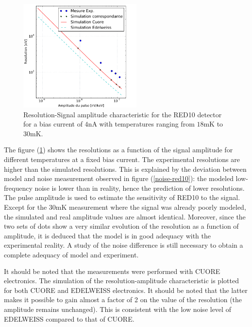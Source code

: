 \begin{figure}[!ht]
\begin{center}
\includegraphics[width=0.55\textwidth]{Figures/Ethem/resamp_fin_fin.pdf}
\end{center}
\caption{Resolution-Signal amplitude characteristic for the RED10 detector for a bias current of $4$nA with temperatures ranging from $18$mK to $30$mK.}
\label{amp-res-red10}
\end{figure}


The figure (\ref{amp-res-red10}) shows the resolutions as a function of the signal amplitude for different temperatures at a fixed bias current. The experimental resolutions are higher than the simulated resolutions. This is explained by the deviation between model and noise measurement observed in figure (\ref{noise-red10}): the modeled low-frequency noise is lower than in reality, hence the prediction of lower resolutions. The pulse amplitude is used to estimate the sensitivity of RED10 to the signal. Except for the $30$mK measurement where the signal was already poorly modeled, the simulated and real amplitude values are almost identical. Moreover, since the two sets of dots show a very similar evolution of the resolution as a function of amplitude, it is deduced that the model is in good adequacy with the experimental reality. A study of the noise difference is still necessary to obtain a complete adequacy of model and experiment.

It should be noted that the measurements were performed with CUORE electronics. The simulation of the resolution-amplitude characteristic is plotted for both CUORE and EDELWEISS electronics. It should be noted that the latter makes it possible to gain almost a factor of 2 on the value of the resolution (the amplitude remains unchanged). This is consistent with the low noise level of EDELWEISS compared to that of CUORE.


